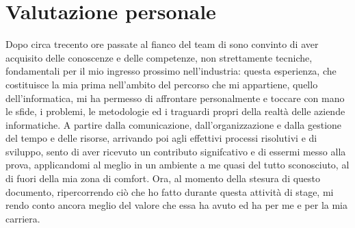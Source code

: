 \section{Valutazione personale}

Dopo circa trecento ore passate al fianco del team di \myAzienda sono convinto di aver acquisito delle conoscenze e delle competenze, non strettamente tecniche, fondamentali per il mio ingresso prossimo nell'industria: questa esperienza, che costituisce la mia prima nell'ambito del percorso che mi appartiene, quello dell'informatica, mi ha permesso di affrontare personalmente e toccare con mano le sfide, i problemi, le metodologie ed i traguardi propri della realtà delle aziende informatiche.
A partire dalla comunicazione, dall'organizzazione e dalla gestione del tempo e delle risorse, arrivando poi agli effettivi processi risolutivi e di sviluppo, sento di aver ricevuto un contributo signifcativo e di essermi messo alla prova, applicandomi al meglio in un ambiente a me quasi del tutto sconosciuto, al di fuori della mia zona di comfort.
Ora, al momento della stesura di questo documento, ripercorrendo ciò che ho fatto durante questa attività di stage, mi rendo conto ancora meglio del valore che essa ha avuto ed ha per me e per la mia carriera.
